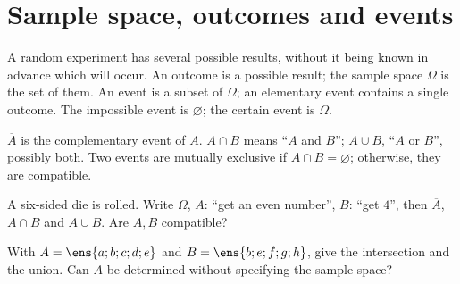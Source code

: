 \section{Sample space, outcomes and events}
\begin{keypoint}[Vocabulary]
A random experiment has several possible results, without it being known in advance which will occur. An outcome is a possible result; the sample space $\Omega$ is the set of them. An event is a subset of $\Omega$; an elementary event contains a single outcome.
The impossible event is $\varnothing$; the certain event is $\Omega$.
\end{keypoint}
\begin{keypoint}
$\overline A$ is the complementary event of $A$. $A\cap B$ means ``$A$ and $B$''; $A\cup B$, ``$A$ or $B$'', possibly both. Two events are mutually exclusive if $A\cap B=\varnothing$; otherwise, they are compatible.
\end{keypoint}
\begin{example}A six-sided die is rolled. Write $\Omega$, $A$: ``get an even number'', $B$: ``get $4$'', then $\overline A$, $A\cap B$ and $A\cup B$. Are $A,B$ compatible?\end{example}
\begin{example}With $A=\ens{a;b;c;d;e}$ and $B=\ens{b;e;f;g;h}$, give the intersection and the union. Can $\overline A$ be determined without specifying the sample space?\end{example}

